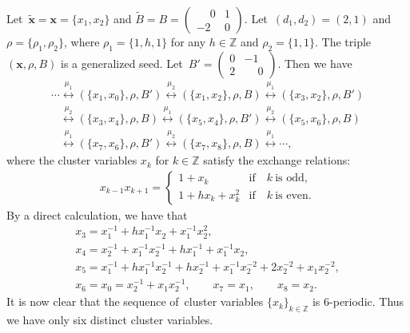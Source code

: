\documentclass[pdftex]{sigma}
\numberwithin{equation}{section}
\begin{document}
\begin{Example}
Let~$\mathbf{\widetilde{x}}=\mathbf{x}=\{x_1,x_2\}$ and
$\widetilde{B}=B=
 \left(\begin{smallmatrix} \phantom{-}0 & 1 \\ -2 & 0 \end{smallmatrix}\right)$.
Let~$(d_1,d_2)=(2,1)$ and $\rho=\{\rho_1,\rho_2\}$, where $\rho_1=\{1,h,1\}$ for any $h\in\mathbb{Z}$ and $\rho_2=\{1,1\}$.
The triple $(\mathbf{x},\rho,B)$ is a generalized seed. Let~$B'=
 \left(\begin{smallmatrix} 0 & -1 \\ 2 & \phantom{-}0 \end{smallmatrix}\right)$.
Then we have
\begin{gather*}
 \cdots\stackrel{\mu_1}\longleftrightarrow(\{x_1,x_0\},\rho,B')
\stackrel{\mu_2}\longleftrightarrow (\{x_1,x_2\},\rho,B)
\stackrel{\mu_1}\longleftrightarrow(\{x_3,x_2\},\rho,B')
\\ \phantom{\cdots}
 {}\stackrel{\mu_2}\longleftrightarrow (\{x_3,x_4\},\rho,B)
\stackrel{\mu_1}\longleftrightarrow(\{x_5,x_4\},\rho,B')
\stackrel{\mu_2}\longleftrightarrow (\{x_5,x_6\},\rho,B)
\\ \phantom{\cdots}
 {} \stackrel{\mu_1}\longleftrightarrow(\{x_7,x_6\},\rho,B')
\stackrel{\mu_2}\longleftrightarrow (\{x_7,x_8\},\rho,B)\stackrel{\mu_1}\longleftrightarrow\cdots,
\end{gather*}
where the cluster variables $x_k$ for $k\in \mathbb{Z}$ satisfy the exchange relations:
\begin{gather*}
 x_{k-1}x_{k+1}=
 \begin{cases}
 1+x_k &\text{if}\quad k \ \text{is odd},
 \\
 1+hx_k+x_{k}^{2}&\text{if}\quad k\ \text{is even}.
 \end{cases}
\end{gather*}
By a direct calculation, we have that
\begin{gather*}
 x_3=x^{-1}_1+hx^{-1}_1x^{}_2+x^{-1}_1x^{2}_2,\\
 x_4= x^{-1}_2+x^{-1}_1x^{-1}_2+hx^{-1}_1+x^{-1}_1x^{}_2,\\
 x_5=x^{-1}_1+hx^{-1}_1x^{-1}_2+hx^{-1}_2+x^{-1}_1x^{-2}_2+2x^{-2}_2+x^{}_1x^{-2}_2,\\
 x_6=x_0=x^{-1}_2+x^{}_1x^{-1}_2, \qquad
 x_7=x_1, \qquad x_8=x_2.
\end{gather*}
It is now clear that the sequence of~cluster variables $\{x_k\}_{k\in\mathbb{Z}}$ is $6$-periodic. Thus we have only six distinct cluster variables.
\end{Example}
\end{document}

